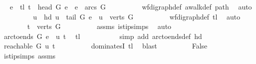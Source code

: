 \begin{isabellebody}
\ \isamarkupfalse%
\ e\ \ tl{\isacharcolon}{\kern0pt}\ {\isachardoublequoteopen}t\ {\isacharequal}{\kern0pt}\ {\isacharparenleft}{\kern0pt}head\ G\ e{\isacharparenright}{\kern0pt}\ {\isasymand}\ e\ {\isasymin}\ arcs\ G{\isachardoublequoteclose}\isanewline
\ \ \ \ \ \ \ \ \isamarkupfalse%
\ wf{\isacharunderscore}{\kern0pt}digraph{\isacharunderscore}{\kern0pt}def\ awalk{\isacharunderscore}{\kern0pt}def\ path\ \isamarkupfalse%
\ auto\isanewline
\ \ \ \ \ \ \isamarkupfalse%
\ \isamarkupfalse%
\ u\ \ hd{\isacharcolon}{\kern0pt}\ {\isachardoublequoteopen}u\ {\isacharequal}{\kern0pt}\ {\isacharparenleft}{\kern0pt}tail\ G\ e{\isacharparenright}{\kern0pt}\ {\isasymand}\ u\ {\isasymin}\ verts\ G{\isachardoublequoteclose}\isanewline
\ \ \ \ \ \ \ \ \isamarkupfalse%
\ wf{\isacharunderscore}{\kern0pt}digraph{\isacharunderscore}{\kern0pt}def\ tl\ \isamarkupfalse%
\ auto\isanewline
\ \ \ \ \ \ \isamarkupfalse%
\ {\isachardoublequoteopen}t\ {\isasymin}\ verts\ G{\isachardoublequoteclose}\isanewline
\ \ \ \ \ \ \ \ \isamarkupfalse%
\ assms{\isacharparenleft}{\kern0pt}{}{\isacharparenright}{\kern0pt}\ is{\isacharunderscore}{\kern0pt}tip{\isachardot}{\kern0pt}simps\ \isamarkupfalse%
\ auto\ \isanewline
\ \ \ \ \ \ \isamarkupfalse%
\ \isamarkupfalse%
\ {\isachardoublequoteopen}arc{\isacharunderscore}{\kern0pt}to{\isacharunderscore}{\kern0pt}ends\ G\ e\ {\isacharequal}{\kern0pt}\ {\isacharparenleft}{\kern0pt}u{\isacharcomma}{\kern0pt}\ t{\isacharparenright}{\kern0pt}{\isachardoublequoteclose}\ \isamarkupfalse%
\ tl\ \isanewline
\ \ \ \ \ \ \ \ \isamarkupfalse%
\ {\isacharparenleft}{\kern0pt}simp\ add{\isacharcolon}{\kern0pt}\ arc{\isacharunderscore}{\kern0pt}to{\isacharunderscore}{\kern0pt}ends{\isacharunderscore}{\kern0pt}def\ hd{\isacharparenright}{\kern0pt}\ \isanewline
\ \ \ \ \ \ \isamarkupfalse%
\ \isamarkupfalse%
\ {\isachardoublequoteopen}reachable{}\ G\ u\ t{\isachardoublequoteclose}\isanewline
\ \ \ \ \ \ \ \ \isamarkupfalse%
\ dominatesI\ tl\ \isamarkupfalse%
\ blast\isanewline
\ \ \ \ \ \ \isamarkupfalse%
\ \isamarkupfalse%
\ False\isanewline
\ \ \ \ \ \ \ \ \isamarkupfalse%
\ is{\isacharunderscore}{\kern0pt}tip{\isachardot}{\kern0pt}simps\ assms{\isacharparenleft}{\kern0pt}{}{\isacharparenright}{\kern0pt}\isanewline

\end{isabellebody}
